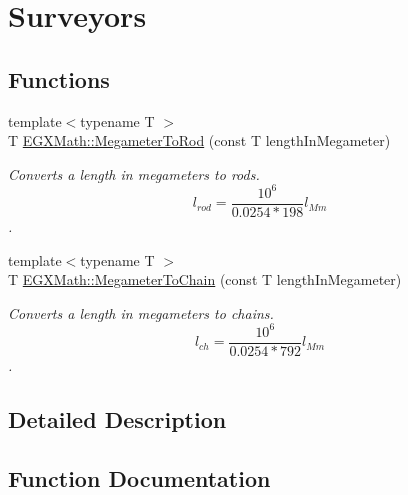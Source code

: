 \hypertarget{group___e_g_x_math-_conversions-_length_conversions-_s_i-_megameter-_surveyors}{}\section{Surveyors}
\label{group___e_g_x_math-_conversions-_length_conversions-_s_i-_megameter-_surveyors}
\subsection*{Functions}
\begin{DoxyCompactItemize}
\item 
{\footnotesize template$<$typename T $>$ }\\T \mbox{\hyperlink{group___e_g_x_math-_conversions-_length_conversions-_s_i-_megameter-_surveyors_ga46cf50c3f1310663facf0befbf3d71fb}{E\+G\+X\+Math\+::\+Megameter\+To\+Rod}} (const T length\+In\+Megameter)
\begin{DoxyCompactList}\small\item\em Converts a length in megameters to rods. \[ l_{rod}= \frac{10^{6}}{0.0254 * 198} l_{Mm} \]. \end{DoxyCompactList}\item 
{\footnotesize template$<$typename T $>$ }\\T \mbox{\hyperlink{group___e_g_x_math-_conversions-_length_conversions-_s_i-_megameter-_surveyors_ga7328b29fbeec6b35bf3b74f58d8bdfc0}{E\+G\+X\+Math\+::\+Megameter\+To\+Chain}} (const T length\+In\+Megameter)
\begin{DoxyCompactList}\small\item\em Converts a length in megameters to chains. \[ l_{ch}= \frac{10^{6}}{0.0254 * 792} l_{Mm} \]. \end{DoxyCompactList}\end{DoxyCompactItemize}


\subsection{Detailed Description}


\subsection{Function Documentation}
\mbox{\label{group___e_g_x_math-_conversions-_length_conversions-_s_i-_megameter-_surveyors_ga7328b29fbeec6b35bf3b74f58d8bdfc0}} 

